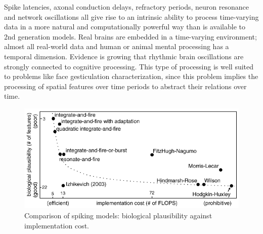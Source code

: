Spike latencies, axonal conduction delays, refractory periods, neuron resonance and network oscillations all give rise to an intrinsic ability to process time-varying data in a more natural and computationally powerful way than is available to 2nd generation models. Real brains are embedded in a time-varying environment; almost all real-world data and human or animal mental processing has a temporal dimension. Evidence is growing that rhythmic brain oscillations are strongly connected to cognitive processing.%
This type of processing is well suited to problems like face gesticulation characterization, since this problem implies the processing of spatial features over time periods to abstract their relations over time.

\begin{figure}[h]
    \centering
   \includegraphics[scale=0.7]{images/Figure3Comparison.png}
    \caption{Comparison of spiking models: biological plausibility against implementation cost.}
    \label{fig:Comparison}
\end{figure}

